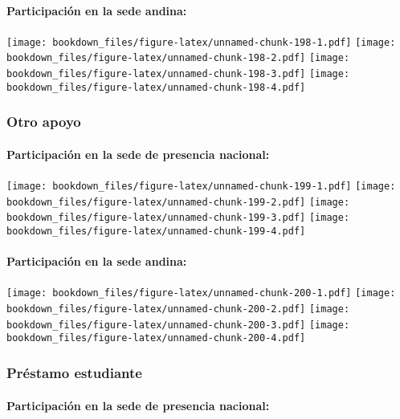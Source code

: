 \documentclass[]{article}
\let\oldparagraph\paragraph
\renewcommand{\paragraph}[1]{\oldparagraph{#1}\mbox{}}
\theoremstyle{definition}
\theoremstyle{definition}
\theoremstyle{definition}
\theoremstyle{remark}
\begin{document}
\paragraph{Participación en la sede
andina:}\label{participacion-en-la-sede-andina-11}

\texttt{[image: bookdown\_files/figure-latex/unnamed-chunk-198-1.pdf]}
\texttt{[image: bookdown\_files/figure-latex/unnamed-chunk-198-2.pdf]}
\texttt{[image: bookdown\_files/figure-latex/unnamed-chunk-198-3.pdf]}
\texttt{[image: bookdown\_files/figure-latex/unnamed-chunk-198-4.pdf]}

\subsubsection{Otro apoyo}\label{otro-apoyo-1}

\paragraph{Participación en la sede de presencia
nacional:}\label{participacion-en-la-sede-de-presencia-nacional-12}

\texttt{[image: bookdown\_files/figure-latex/unnamed-chunk-199-1.pdf]}
\texttt{[image: bookdown\_files/figure-latex/unnamed-chunk-199-2.pdf]}
\texttt{[image: bookdown\_files/figure-latex/unnamed-chunk-199-3.pdf]}
\texttt{[image: bookdown\_files/figure-latex/unnamed-chunk-199-4.pdf]}

\paragraph{Participación en la sede
andina:}\label{participacion-en-la-sede-andina-12}

\texttt{[image: bookdown\_files/figure-latex/unnamed-chunk-200-1.pdf]}
\texttt{[image: bookdown\_files/figure-latex/unnamed-chunk-200-2.pdf]}
\texttt{[image: bookdown\_files/figure-latex/unnamed-chunk-200-3.pdf]}
\texttt{[image: bookdown\_files/figure-latex/unnamed-chunk-200-4.pdf]}

\subsubsection{Préstamo estudiante}\label{prestamo-estudiante-1}

\paragraph{Participación en la sede de presencia
nacional:}\label{participacion-en-la-sede-de-presencia-nacional-13}
\end{document}
